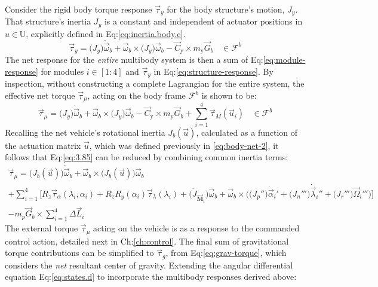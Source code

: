 Consider the rigid body torque response $\vec{\tau}_y$ for the body structure's motion, $J_y$. That structure's inertia $J_y$ is a constant and independent of actuator positions in $u\in\mathbb{U}$, explicitly defined in Eq:\ref{eq:inertia.body.c}.
\begin{equation}\label{eq:structure-response}
\vec{\tau}_y=\big(J_y\big)\dot{\vec{\omega}}_b+\vec{\omega}_b\times\big(J_y\big)\vec{\omega}_b-\vec{C}_\text{y}\times m_\text{y}\vec{G}_b~~~~\in\mathcal{F}^b
\end{equation}
The net response for the \emph{entire} multibody system is then a sum of Eq:\ref{eq:module-response} for modules $i\in[1:4]$ and $\vec{\tau}_y$ in Eq:\ref{eq:structure-response}. By inspection, without constructing a complete Lagrangian for the entire system, the effective net torque $\vec{\tau}_{\mu}$, acting on the body frame $\mathcal{F}^b$ is shown to be:
\begin{equation}\label{eq:3.85}
\vec{\tau}_\mu = \big(J_y\big)\dot{\vec{\omega}}_b+\vec{\omega}_b\times\big(J_y\big)\vec{\omega}_b-\vec{C}_\text{y}\times m_\text{y}\vec{G}_b+\sum_{i=1}^{4}\vec{\tau}_{M}(\vec{u}_i)~~~~\in\mathcal{F}^b
\end{equation}
Recalling the net vehicle's rotational inertia $J_b(\vec{u})$, calculated as a function of the actuation matrix $\vec{u}$, which was defined previously in \ref{eq:body-net-2}, it follows that Eq:\ref{eq:3.85} can be reduced by combining common inertia terms:
\begin{multline}\label{eq:3.109}
\vec{\tau}_\mu=\big(J_b(\vec{u})\big)\dot{\vec{\omega}}_b+\vec{\omega}_b\times\big(J_b(\vec{u})\big)\vec{\omega}_b
\\
+\sum_{i=1}^{4}\Big[R_z\vec{\tau}_\alpha(\lambda_i,\alpha_i)+R_zR_y(\alpha_i)\vec{\tau}_\lambda(\lambda_i)+\big(\dot{J}_{\vec{\mathbf{M}}_i}\big)\vec{\omega}_b+\vec{\omega}_b\times\Big(\big(J_p''\big)\dot{\vec{\alpha}}_i'+\big(J_n'''\big)\dot{\vec{\lambda}}_i''+\big(J_r'''\big)\vec{\Omega}_i'''\Big)\Big]
\\
-m_p\vec{G}_b\times\sum_{i=1}^{4}\Delta \vec{L}_i
\end{multline}
The external torque $\vec{\tau}_{\mu}$ acting on the vehicle is as a response to the commanded control action, detailed next in Ch:\ref{ch:control}. The final sum of gravitational torque contributions can be simplified to $\vec{\tau}_g$, from Eq:\ref{eq:grav-torque}, which considers the \emph{net} resultant center of gravity. Extending the angular differential equation Eq:\ref{eq:states.d} to incorporate the multibody responses derived above:
